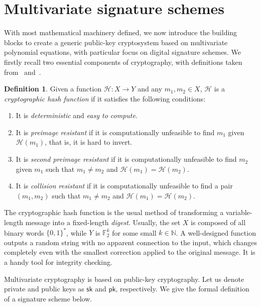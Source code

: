 \documentclass[12pt, a4paper, oneside]{memoir}
\theoremstyle{definition}
\newtheorem{definition}[theorem]{Definition}
\begin{document}
\section{Multivariate signature schemes}\label{sec:mult}

With most mathematical machinery defined, we now introduce the building blocks to create a generic public-key cryptosystem based on multivariate polynomial equations, with particular focus on digital signature schemes. We firstly recall two essential components of cryptography, with definitions taken from~\cite[Sec.~7.1]{Gathen:2015} and~\cite[Sec.~6.1]{Goldreich:2004}.

\begin{definition}
  Given a function $\mathcal{H} : X \to Y$ and any $m_{1}, m_{2} \in X$, $\mathcal{H}$ is a \emph{cryptographic hash function} if it satisfies the following conditions:
  
  \begin{enumerate}
    \item It is \emph{deterministic} and \emph{easy to compute}.
    \item It is \emph{preimage resistant} if it is computationally unfeasible to find $m_{1}$ given $\mathcal{H}(m_{1})$, that is, it is hard to invert.
    \item It is \emph{second preimage resistant} if it is computationally unfeasible to find $m_{2}$ given $m_{1}$ such that $m_{1} \neq m_{2}$ and $\mathcal{H}(m_{1}) = \mathcal{H}(m_{2})$.
    \item It is \emph{collision resistant} if it is computationally unfeasible to find a pair $(m_{1}, m_{2})$ such that $m_{1} \neq m_{2}$ and $\mathcal{H}(m_{1}) = \mathcal{H}(m_{2})$.
  \end{enumerate}
\end{definition}

The cryptographic hash function is the usual method of transforming a variable-length message into a fixed-length \emph{digest}. Usually, the set $X$ is composed of all binary words $\{0, 1\}^{*}$, while $Y$ is $\mathbb{F}_{2}^{k}$ for some small $k \in \mathbb{N}$. A well-designed function outputs a random string with no apparent connection to the input, which changes completely even with the smallest correction applied to the original message. It is a handy tool for integrity checking.

Multivariate cryptography is based on public-key cryptography. Let us denote private and public keys as $\mathsf{sk}$ and $\mathsf{pk}$, respectively. We give the formal definition of a signature scheme below.
\end{document}
